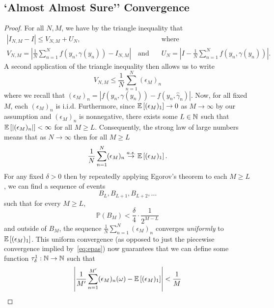 
\subsection{`Almost Almost Sure'' Convergence}
\label{sec:app:consistent}

\theConsistent*

\begin{proof}
	For all $N, M$, we have by the triangle inequality that
		\begin{align*}
	\left|I_{N,M} - I\right| \leq V_{N,M} + U_N, &\quad \text{where} \\
		V_{N,M} = \left|\frac{1}{N} \sum_{n=1}^N f(y_n, \gamma(y_n)) - I_{N,M} \right| 
		\quad \text{and}& \quad
		U_N = \left|I - \frac{1}{N} \sum_{n=1}^N f(y_n, \gamma(y_n)) \right|.
	\end{align*}
	A second application of the triangle inequality then allows us to write
	\[
    V_{N,M} \leq \frac{1}{N} \sum_{n=1}^N (\epsilon_M)_n
	\]
	where we recall that $(\epsilon_M)_n = |f(y_n, \gamma(y_n)) - f(y_n, \hat{\gamma}_n)|$.
	Now, for all fixed $M$, each $(\epsilon_M)_n$ is i.i.d. Furthermore, since
        $\mathbb{E}
	\left[(\epsilon_M)_1\right] \to 0$ as $M \to \infty$ by our assumption and 
	$(\epsilon_M)_n$ is nonnegative, there exists some $L \in \mathbb{N}$
	such that $\mathbb{E}\left[\left|(\epsilon_M)_n \right|\right] < \infty$ for all $M \geq L$.
	Consequently, the strong law of large numbers means that as $N \to \infty$ then for all $M \geq L$
	\begin{align}
	\label{eq:epas}
	\frac{1}{N} \sum_{n=1}^N (\epsilon_M)_n \overset{a.s.}{\to} \mathbb{E}\left[(\epsilon_M)_1\right].
	\end{align}      
        For any fixed $\delta > 0$ then by repeatedly applying Egorov's theorem to each $M \geq L$,
        we can find a sequence of events 
        \[
                B_{L}, B_{L+1}, B_{L+2}, \ldots
        \]
        such that for every $M \geq L$,
        \[
                \mathbb{P}(B_{M}) < \frac{\delta}{4} \cdot \frac{1}{2^{M-L}}
        \]
        and outside of $B_{M}$, the sequence $\frac{1}{N} \sum_{n=1}^N (\epsilon_M)_n$
        converges \emph{uniformly} to $\mathbb{E}\left[(\epsilon_M)_1\right]$. 
        This uniform convergence (as opposed to just the piecewise convergence implied
        by~\eqref{eq:epas}) now guarantees that we can define some function
        $\tau^1_\delta : \mathbb{N} \to \mathbb{N}$ such that 
	\begin{align}
	\label{eq:ombo}
                \left|\frac{1}{M'} \sum_{n=1}^{M'} (\epsilon_M)_n(\omega) - \E\left[(\epsilon_M)_1\right]\right| < \frac{1}{M} 

\end{align}
\end{proof}
